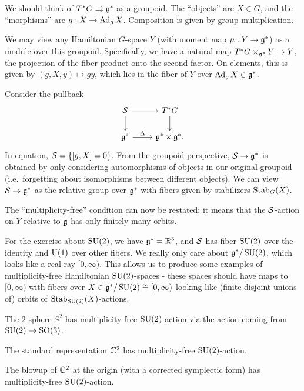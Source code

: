 \documentclass{article}
\begin{document}
We should think of $T^*G \rightrightarrows \mathfrak{g}^*$ as a groupoid.
The ``objects'' are $X \in G$, and the ``morphisms'' are $g: X \to \operatorname{Ad}_g X$.
Composition is given by group multiplication.

We may view any Hamiltonian $G$-space $Y$ (with moment map $\mu: Y \to \mathfrak{g}^*$) as a module over this groupoid.
Specifically, we have a natural map $T^*G \times_{\mathfrak{g}^*} Y \to Y$, the projection of the fiber product onto the second factor.
On elements, this is given by $(g, X, y) \mapsto gy$, which lies in the fiber of $Y$ over $\operatorname{Ad}_g X \in \mathfrak{g}^*$.

Consider the pullback
\[
	\begin{tikzcd}
		\Sc \rar \dar & T^*G \dar \\
		\gf^* \rar["\Delta"] & \gf^* \times \gf^*.
	\end{tikzcd}
\]
In equation, $\mathcal{S} = \{ [g, X] = 0 \}$.
From the groupoid perspective, $\mathcal{S} \to \mathfrak{g}^*$ is obtained by only considering automorphisms of objects in our original groupoid (i.e.\ forgetting about isomorphisms between different objects).
We can view $\mathcal{S} \to \mathfrak{g}^*$ as the relative group over $\mathfrak{g}^*$ with fibers given by stabilizers $\operatorname{Stab}_G(X)$.

The ``multiplicity-free'' condition can now be restated: it means that the $\mathcal{S}$-action on $Y$ relative to $\mathfrak{g}$ has only finitely many orbits.

For the exercise about $\operatorname{SU}(2)$, we have $\mathfrak{g}^* = \mathbb{R}^3$, and $\mathcal{S}$ has fiber $\operatorname{SU}(2)$ over the identity and $\operatorname{U}(1)$ over other fibers.
We really only care about $\mathfrak{g}^* / \operatorname{SU}(2)$, which looks like a real ray $[0, \infty)$.
This allows us to produce some examples of multiplicity-free Hamiltonian $\operatorname{SU}(2)$-spaces - these spaces should have maps to $[0, \infty)$ with fibers over $X \in \mathfrak{g}^* / \operatorname{SU}(2) \cong [0, \infty)$ looking like (finite disjoint unions of) orbits of $\operatorname{Stab}_{\operatorname{SU}(2)}(X)$-actions.

\begin{ex}
	The $2$-sphere $S^2$ has multiplicity-free $\operatorname{SU}(2)$-action via the action coming from $\operatorname{SU}(2) \to \operatorname{SO}(3)$.
\end{ex}

\begin{ex}
	The standard representation $\mathbb{C}^2$ has multiplicity-free $\operatorname{SU}(2)$-action.
\end{ex}

\begin{ex}
	The blowup of $\mathbb{C}^2$ at the origin (with a corrected symplectic form) has multiplicity-free $\operatorname{SU}(2)$-action.
\end{ex}
\end{document}
